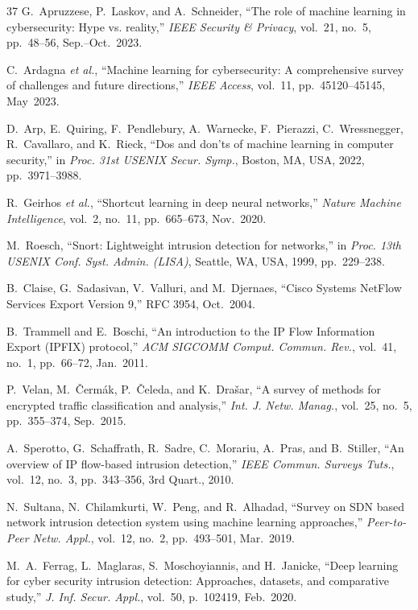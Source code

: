 \documentclass[conference]{IEEEtran}
\begin{document}
\begin{thebibliography}{37}
G.~Apruzzese, P.~Laskov, and A.~Schneider, ``The role of machine learning in cybersecurity: Hype vs. reality,'' \textit{IEEE Security \& Privacy}, vol.~21, no.~5, pp.~48--56, Sep.--Oct.~2023.

C.~Ardagna \textit{et al.}, ``Machine learning for cybersecurity: A comprehensive survey of challenges and future directions,'' \textit{IEEE Access}, vol.~11, pp.~45120--45145, May~2023.

D.~Arp, E.~Quiring, F.~Pendlebury, A.~Warnecke, F.~Pierazzi, C.~Wressnegger, R.~Cavallaro, and K.~Rieck, ``Dos and don'ts of machine learning in computer security,'' in \textit{Proc. 31st USENIX Secur. Symp.}, Boston, MA, USA, 2022, pp.~3971--3988.

R.~Geirhos \textit{et al.}, ``Shortcut learning in deep neural networks,'' \textit{Nature Machine Intelligence}, vol.~2, no.~11, pp.~665--673, Nov.~2020.

M.~Roesch, ``Snort: Lightweight intrusion detection for networks,'' in \textit{Proc. 13th USENIX Conf. Syst. Admin. (LISA)}, Seattle, WA, USA, 1999, pp.~229--238.

B.~Claise, G.~Sadasivan, V.~Valluri, and M.~Djernaes, ``Cisco Systems NetFlow Services Export Version 9,'' RFC 3954, Oct.~2004.

B.~Trammell and E.~Boschi, ``An introduction to the IP Flow Information Export (IPFIX) protocol,'' \textit{ACM SIGCOMM Comput. Commun. Rev.}, vol.~41, no.~1, pp.~66--72, Jan.~2011.

P.~Velan, M.~{\v{C}}erm{\'a}k, P.~{\v{C}}eleda, and K.~Dra{\v{s}}ar, ``A survey of methods for encrypted traffic classification and analysis,'' \textit{Int. J. Netw. Manag.}, vol.~25, no.~5, pp.~355--374, Sep.~2015.

A.~Sperotto, G.~Schaffrath, R.~Sadre, C.~Morariu, A.~Pras, and B.~Stiller, ``An overview of IP flow-based intrusion detection,'' \textit{IEEE Commun. Surveys Tuts.}, vol.~12, no.~3, pp.~343--356, 3rd Quart., 2010.

N.~Sultana, N.~Chilamkurti, W.~Peng, and R.~Alhadad, ``Survey on SDN based network intrusion detection system using machine learning approaches,'' \textit{Peer-to-Peer Netw. Appl.}, vol.~12, no.~2, pp.~493--501, Mar.~2019.

M.~A.~Ferrag, L.~Maglaras, S.~Moschoyiannis, and H.~Janicke, ``Deep learning for cyber security intrusion detection: Approaches, datasets, and comparative study,'' \textit{J. Inf. Secur. Appl.}, vol.~50, p.~102419, Feb.~2020.


\end{thebibliography}
\end{document}
